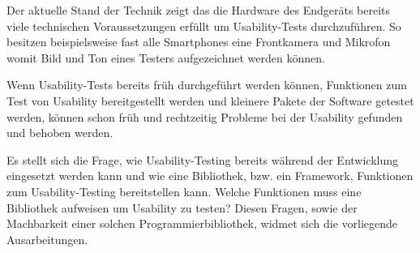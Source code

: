 Der aktuelle Stand der Technik zeigt das die Hardware des Endgeräts bereits viele technischen Voraussetzungen erfüllt um Usability-Tests durchzuführen. 
So besitzen beispielsweise fast alle Smartphones eine Frontkamera und Mikrofon womit Bild und Ton eines Testers aufgezeichnet werden können. 

Wenn Usability-Tests bereits früh durchgeführt werden können, Funktionen zum Test von Usability bereitgestellt werden und kleinere Pakete der Software getestet werden, können schon früh und rechtzeitig Probleme bei der Usability gefunden und behoben werden.

Es stellt sich die Frage, wie Usability-Testing bereits während der Entwicklung eingesetzt werden kann und wie eine Bibliothek, bzw. ein Framework, Funktionen zum Usability-Testing bereitstellen kann. 
Welche Funktionen muss eine Bibliothek aufweisen um Usability zu testen? Diesen Fragen, sowie der Machbarkeit einer solchen Programmierbibliothek, widmet sich die vorliegende Ausarbeitungen. 



\cite{usabilityEngineeringKompakt}

\cite{nodejs_therightway}